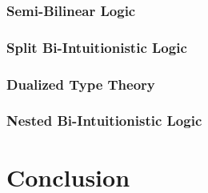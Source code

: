 \subsubsection{Semi-Bilinear Logic}
\label{subsec:semi-bilinear_logic}


\subsubsection{Split Bi-Intuitionistic Logic}
\label{subsec:split_bi-intuitionistic_logic}


\subsubsection{Dualized Type Theory}
\label{subsubsec:dualized_type_theory}


\subsubsection{Nested Bi-Intuitionistic Logic}
\label{subsec:nested_bi-intuitionistic_logic}



 
\section{Conclusion}
\label{sec:conclusion}


 

